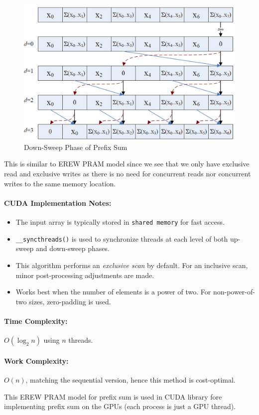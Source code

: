 \documentclass[12pt]{book}
\begin{document}
\begin{figure}[H]
    \centering
    \includegraphics[width=0.6\linewidth]{images/downsweep.png}
    \caption{Down-Sweep Phase of Prefix Sum}
    \label{fig:downsweep}
\end{figure}
This is similar to EREW PRAM model since we see that we only have exclusive read and exclusive writes as there is no need for concurrent reads nor concurrent writes to the same memory location.

\paragraph{CUDA Implementation Notes:}
\begin{itemize}
    \item The input array is typically stored in \texttt{shared memory} for fast access.
    \item \texttt{\_\_syncthreads()} is used to synchronize threads at each level of both up-sweep and down-sweep phases.
    \item This algorithm performs an \textit{exclusive scan} by default. For an inclusive scan, minor post-processing adjustments are made.
    \item Works best when the number of elements is a power of two. For non-power-of-two sizes, zero-padding is used.
\end{itemize}

\paragraph{Time Complexity:} $O(\log_2 n)$ using $n$ threads.

\paragraph{Work Complexity:} $O(n)$, matching the sequential version, hence this method is cost-optimal.

This EREW PRAM model for prefix sum is used in CUDA library fore implementing prefix sum on the GPUs (each process is just a GPU thread).
\end{document}
